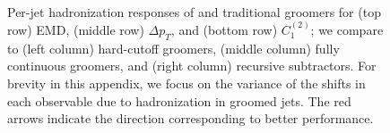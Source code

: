 \begin{subappendices}
\begin{figure}[p]
{    }
    \\
    \caption[Per-jet \gls{hadronization} responses of the EMD, \(\Delta p_T\), and \(\Delta C_1^{(2)}\) using a plethora of fully continuous, hard-cutoff, and recusive subtraction grooming strategies.]{
    Per-jet \gls{hadronization} responses of \PIRANHA{} and traditional groomers for (top row) EMD, (middle row) \(\Delta p_T\), and (bottom row) \(C_1^{(2)}\);
    we compare  to (left column) hard-cutoff groomers, (middle column) fully continuous groomers, and (right column) recursive subtractors.
    For brevity in this appendix, we focus on the variance of the shifts in each observable due to \gls{hadronization} in groomed jets.
    The red arrows indicate the direction corresponding to better performance.
}
\label{fig:pvhfrenzy}
\end{figure}




\end{subappendices}
